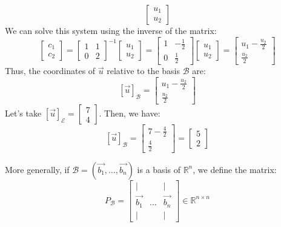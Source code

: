 \begin{eg}
\[\begin{bmatrix}
        u_1 \\ u_2
    \end{bmatrix} \]
    We can solve this system using the inverse of the matrix:
    \[ \begin{bmatrix}
        c_1 \\ c_2
    \end{bmatrix} = \begin{bmatrix}
        1 & 1 \\
        0 & 2
    \end{bmatrix}^{-1} \begin{bmatrix}
        u_1 \\ u_2
    \end{bmatrix} = \begin{bmatrix}
        1 & -\frac{1}{2} \\
        0 & \frac{1}{2}
    \end{bmatrix} \begin{bmatrix}
        u_1 \\ u_2
    \end{bmatrix} = \begin{bmatrix}
        u_1 - \frac{u_2}{2} \\ \frac{u_2}{2}
    \end{bmatrix} \]
    Thus, the coordinates of $\vec{u}$ relative to the basis $\mathcal{B}$ are:
    \[ [\vec{u}]_{\mathcal{B}} = \begin{bmatrix}
        u_1 - \frac{u_2}{2} \\ \frac{u_2}{2}
    \end{bmatrix} \]
    Let's take $[\vec{u}]_{\mathcal{E}} = \begin{bmatrix}
        7 \\ 4
    \end{bmatrix}$. Then, we have:
    \[ [\vec{u}]_{\mathcal{B}} = \begin{bmatrix}
        7 - \frac{4}{2} \\ \frac{4}{2}
    \end{bmatrix} = \begin{bmatrix}
        5 \\ 2
    \end{bmatrix} \]
\end{eg}
More generally, if $\mathcal{B} = (\vec{b_1}, \ldots, \vec{b_n})$ is a basis of $\mathbb{R}^n$, we define the matrix:
\[ P_{\mathcal{B}} = \begin{bmatrix}
    | & & | \\
    \vec{b_1} & \ldots & \vec{b_n} \\
    | & & |
\end{bmatrix} \in \mathbb{R}^{n \times n} \]

